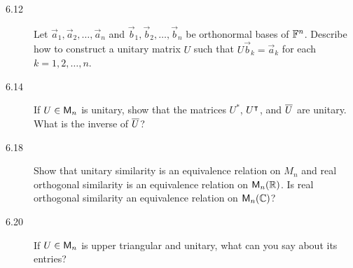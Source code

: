 \documentclass{homework}
\begin{document}
\begin{description}
  \begin{solution}

  \end{solution}

\item[6.12] Let \(\vec a_1, \vec a_2, \dots, \vec a_n\) and
  \(\vec b_1, \vec b_2, \dots, \vec b_n\) be orthonormal bases of
  \(\mathbb F^n\).  Describe how to construct a unitary matrix \(U\) such
  that \(U \vec b_k = \vec a_k\) for each \(k = 1, 2, \dots, n\).

  \begin{solution}

  \end{solution}

\item[6.14] If \(U \in \mathsf{M}_n\) is unitary, show that the matrices
  \(U^*\), \(U^\intercal\), and \(\overline{U}\) are unitary.  What is the
  inverse of \(\overline{U}\)?

  \begin{solution}

  \end{solution}

\item[6.18] Show that unitary similarity is an equivalence relation on
  \(M_n\) and real orthogonal similarity is an equivalence relation on
  \(\mathsf{M}_n (\mathbb R)\).  Is real orthogonal similarity an equivalence
  relation on \(\mathsf{M}_n (\mathbb C)\)?

  \begin{solution}

  \end{solution}

\item[6.20] If \(U \in \mathsf{M}_n\) is upper triangular and unitary, what
  can you say about its entries?

  \begin{solution}

  \end{solution}
\end{description}
\end{document}
